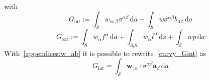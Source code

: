 with 
    \begin{equation}\label{curvy_Gint}
        G_{\mathrm{int}} := \int_{\mathcal{S}} w_{\alpha ; \beta} \sigma^{\alpha \beta} \, \mathrm{d} a - \int_{\mathcal{S}} w \sigma^{\alpha \beta} b_{\alpha \beta} \, \mathrm{d} a 
    \end{equation}
    \begin{equation}\label{curvy_Gext}
        G_{\mathrm{ext}} := \int_{\mathcal{S}} w_{\alpha} f^{\alpha} \, \mathrm{d} a + \int_{\partial_{t} \mathcal{S}} w_{\alpha} \overline{t}^{\alpha} \, \mathrm{d} s + \int_{\mathcal{S}} w p \, \mathrm{d} a
    \end{equation}
With~\eqref{appendices:w_ab} it is possible to rewrite~\eqref{curvy_Gint} as
    \begin{equation}\label{eq:weak_11}
    G_{\mathrm{int}} = \int_{\mathcal{S}} \boldsymbol{w}_{; \alpha} \cdot \sigma^{\alpha \beta} \boldsymbol{a}_{\beta} \, \mathrm{d} a
    \end{equation}
%
%
